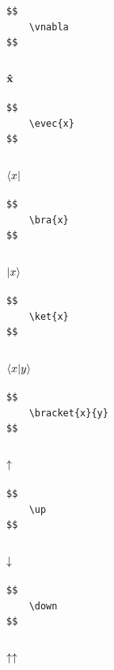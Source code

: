 \documentclass[a4paper]{article}
\begin{document}
\begin{verbatim}
$$
	\vnabla
$$
\end{verbatim}

\subsubsection{$ \mathbf{\hat{x}}$}

\begin{verbatim}
$$
	\evec{x}
$$
\end{verbatim}

\subsubsection{$ \langle x|$}

\begin{verbatim}
$$
	\bra{x}
$$
\end{verbatim}

\subsubsection{$ |x\rangle$}

\begin{verbatim}
$$
	\ket{x}
$$
\end{verbatim}

\subsubsection{$ \langle x| y\rangle$}

\begin{verbatim}
$$
	\bracket{x}{y}
$$
\end{verbatim}

\subsubsection{$ \uparrow$}

\begin{verbatim}
$$
	\up
$$
\end{verbatim}

\subsubsection{$ \downarrow$}

\begin{verbatim}
$$
	\down
$$
\end{verbatim}

\subsubsection{$ \uparrow \uparrow$}
\end{document}
